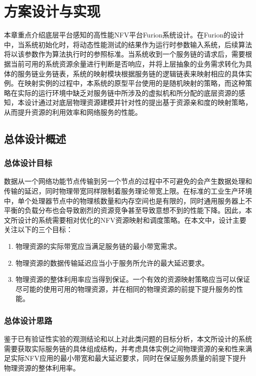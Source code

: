 \chapter{方案设计与实现}
\label{chap:design}
本章重点介绍底层平台感知的高性能NFV平台Furion系统设计。在Furion的设计中，当系统初始化时，将动态性能测试的结果作为运行时参数输入系统，后续算法将以该参数作为算法执行时的参照标准。当系统收到一个服务链的请求后，需要根据当前可用的系统资源余量进行判断是否响应，并将上层抽象的业务需求转化为具体的服务链业务链表，系统的映射模块根据服务链的逻辑链表来映射相应的具体实例。在映射实例的过程中，本系统的原型平台使用的是随机映射的策略，而这种策略在实际的运行环境中缺乏对服务链中所涉及的虚拟机和所分配的底层资源的感知，本设计通过对底层物理资源建模并针对性的提出基于资源亲和度的映射策略，从而提升资源的利用效率和网络服务的性能。

\section{总体设计概述}
\subsection{总体设计目标}
数据从一个网络功能节点传输到另一个节点的过程中不可避免的会产生数据处理和传输的延迟，同时物理带宽同样限制着服务理论带宽上限。在标准的工业生产环境中，单个处理器节点中的物理核数量和内存空间也是有限的，同时通用服务器上不平衡的负载分布也会导致剧烈的资源竞争甚至导致意想不到的性能下降。因此，本文所设计的系统需要相对优化的NFV资源映射和调度策略。在本文中，设计主要关注以下的三个目标：
\begin{enumerate}
	\item 物理资源的实际带宽应当满足服务链的最小带宽需求。
	\item 物理资源的数据传输延迟应当小于服务所允许的最大延迟要求。
	\item 物理资源的整体利用率应当得到保证。一个有效的资源映射策略应当可以保证尽可能的使用可用的物理资源，并在相同的物理资源的前提下提升服务的性能。
\end{enumerate}

\subsection{总体设计思路}
鉴于已有验证性实验的观测结论和以上对此类问题的目标分析，本文所设计的系统需要获取实际服务链的具体组成结构，并考虑具体实例之间物理资源的亲和性来满足实际NFV应用的最小带宽和最大延迟要求，同时在保证服务质量的前提下提升物理资源的整体利用率。


